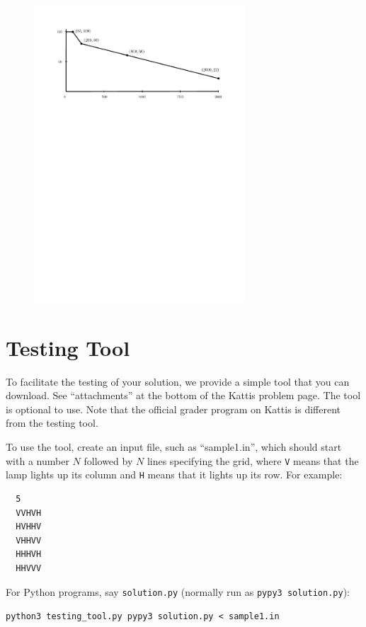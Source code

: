 \begin{figure}
\centering
\includegraphics[width=0.7\textwidth]{scoreplot.pdf}
\end{figure}

\section*{Testing Tool}
To facilitate the testing of your solution, we provide a simple tool that you can download.
See ``attachments'' at the bottom of the Kattis problem page. The tool is optional to use. Note that the official grader program on Kattis is different from the testing tool.

To use the tool, create an input file, such as ``sample1.in'', which should start with a number $N$ followed by $N$ lines specifying the grid, where \texttt{V} means that the lamp lights up its column and \texttt{H} means that it lights up its row. For example:

\begin{verbatim}
  5
  VVHVH
  HVHHV
  VHHVV
  HHHVH
  HHVVV
  \end{verbatim}


  For Python programs, say \verb|solution.py| (normally run as \verb|pypy3 solution.py|):

  \verb|python3 testing_tool.py pypy3 solution.py < sample1.in|

